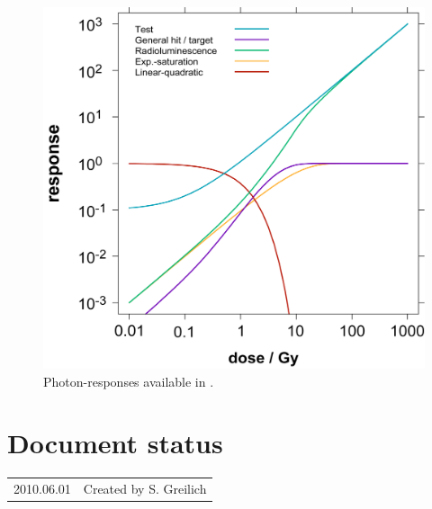 \begin{figure}
	\centering
		\includegraphics[width=1.0\textwidth]{GR.png}
	\caption{Photon-responses available in \la{}.}
	\label{fig:GRs}
\end{figure}


\section*{Document status}
\begin{tabular}{l l}
2010.06.01&Created by S. Greilich
\end{tabular}